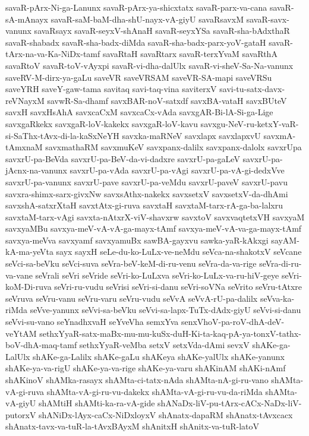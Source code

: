 {savaR-pArx-Ni-ga-Lanunx
savaR-pArx-ya-shicxtatx
savaR-parx-va-cana
savaR-sA-mAnayx
savaR-saM-baM-dha-shU-nayx-vA-giyU
savaRsavxM
savaR-savx-vanunx
savaRsayx
savaR-seyxV-shAnaH
savaR-seyxYSa
savaR-sha-bAdxthaR
savaR-shabadx
savaR-sha-badx-diMda
savaR-sha-badx-parx-yoV-gataH
savaR-tArx-na-va-Ka-NiDx-tamf
savaRtaH
savaRtarx
savaR-terxYvaM
savaRthA
savaRtoV
savaR-toV-vAyxpi
savaR-vi-dha-dalUlx
savaR-vi-sheV-Sa-Na-vanunx
saveRV-M-dirx-ya-gaLu
saveVR
saveVRSAM
saveVR-SA-mapi
saveVRSu
saveYRH
saveY-gaw-tama
savitaq
savi-taq-vina
saviterxV
savi-tu-satx-davx-reVNayxM
savwR-Sa-dhamf
savxBAR-noV-satxdf
savxBA-vataH
savxBUteV
savxH
savxHsAhA
savxcaCxM
savxcaCx-vAda
savxgAR-Bi-lA-Si-ga-Lige
savxgaRkekx
savxgaR-loV-kakekx
savxgaR-loV-kavu
savxgu-NeV-ru-ketxY-vaR-si-SaThx-tAvx-di-la-kaSxNeYH
savxka-maRNeV
savxlapx
savxlapxvU
savxmA-tAmxnaM
savxmathaRM
savxmuKeV
savxpanx-dalilx
savxpanx-dalolx
savxrUpa
savxrU-pa-BeVda
savxrU-pa-BeV-da-vi-dadxre
savxrU-pa-gaLeV
savxrU-pa-jAcnx-na-vanunx
savxrU-pa-vAda
savxrU-pa-vAgi
savxrU-pa-vA-gi-dedxVve
savxrU-pa-vanunx
savxrU-pave
savxrU-pa-veMdu
savxrU-paveV
savxrU-pavu
savxra-shimx-sarx-givxNw
savxsAthx-nakekx
savxsetxV
savxsetxV-da-dhAmi
savxshA-satxrXtaH
savxtAtx-gi-ruva
savxtaH
savxtaM-tarx-rA-ga-ba-lalxru
savxtaM-tarx-vAgi
savxta-nAtxrX-viV-shavxrw
savxtoV
savxvaqtetxVH
savxyaM
savxyaMBu
savxya-meV-vA-vA-ga-mayx-tAmf
savxya-meV-vA-va-ga-mayx-tAmf
savxya-meVva
savxyamf
savxyamuBx
sawBA-gayxvu
sawka-yaR-kAkxgi
sayAM-kA-ma-yeVta
sayx
sayxH
seLe-du-ko-LuLx-ve-neMdu
seVca-na-shakotxV
seVcane
seVci-sa-beVku
seVci-suva
seVra-beV-keM-di-ru-venu
seVra-da-va-rige
seVra-di-ru-va-vane
seVrali
seVri
seVride
seVri-ko-LuLxva
seVri-ko-LuLx-va-ru-hiV-geye
seVri-koM-Di-ruva
seVri-ru-vudu
seVrisi
seVri-si-danu
seVri-soVNa
seVrito
seVru-tAtxre
seVruva
seVru-vanu
seVru-varu
seVru-vudu
seVvA
seVvA-rU-pa-dalilx
seVva-ka-riMda
seVve-yanunx
seVvi-sa-beVku
seVvi-sa-lapx-TuTx-dAdx-giyU
seVvi-si-danu
seVvi-su-vano
seYnadhxvaH
seYveVha
semxYva
senxVhoV-pa-roV-dhA-deV-veYtAM
sethxYyaR-satx-maBx-mu-mu-kuSx-duH-Ki-ta-kaq-pA-ya-tonxV-tathx-boV-dhA-maq-tamf
sethxYyaR-veMba
setxV
setxVda-dAmi
sevxV
shAKe-ga-LalUlx
shAKe-ga-Lalilx
shAKe-gaLu
shAKeya
shAKe-yalUlx
shAKe-yanunx
shAKe-ya-va-rigU
shAKe-ya-va-rige
shAKe-ya-varu
shAKinAM
shAKi-nAmf
shAKinoV
shAMka-rasayx
shAMta-ci-tatx-nAda
shAMta-nA-gi-ru-vano
shAMta-vA-gi-ruva
shAMta-vA-gi-ru-vu-dakekx
shAMta-vA-gi-ru-vu-da-riMda
shAMta-vA-giyU
shAMtiH
shAMti-ka-ra-vA-gide
shANaDx-liV-pu-tArx-cACx-NaDx-liV-putorxV
shANiDx-lAyx-caCx-NiDxloyxV
shAnatx-dapaRM
shAnatx-tAvxcacx
shAnatx-tavx-va-tuR-la-tAvxBAyxM
shAnitxH
shAnitx-va-tuR-latoV
}
